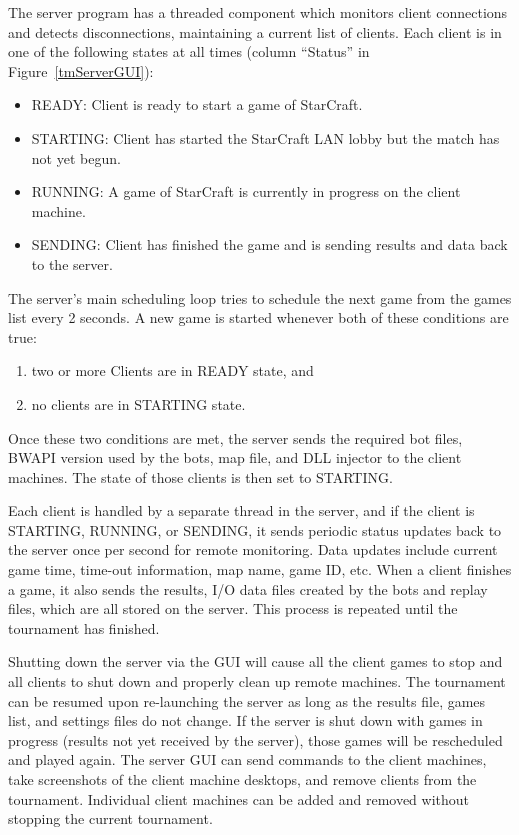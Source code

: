 The server program has a threaded component which monitors client connections and detects disconnections, maintaining a current list of clients. Each client is in one of the following states at all times (column ``Status'' in Figure~\ref{tmServerGUI}):

\begin{itemize}
\item READY: Client is ready to start a game of StarCraft.
\item STARTING: Client has started the StarCraft LAN lobby but the match has not yet begun.
\item RUNNING: A game of StarCraft is currently in progress on the client machine.
\item SENDING: Client has finished the game and is sending results and data back to the server.
\end{itemize}

The server's main scheduling loop tries to schedule the next game from the games list every 2 seconds. A new game is started whenever both of these conditions are true:

\begin{enumerate}
\item two or more Clients are in READY state, and
\item no clients are in STARTING state.
\end{enumerate}

\noindent Once these two conditions are met, the server sends the required bot files, BWAPI version used by the bots, map file, and DLL injector to the client machines. The state of those clients is then set to STARTING.

Each client is handled by a separate thread in the server, and if the client is STARTING, RUNNING, or SENDING, it sends periodic status updates back to the server once per second for remote monitoring. Data updates include current game time, time-out information, map name, game ID, etc. When a client finishes a game, it also sends the results, I/O data files created by the bots and replay files, which are all stored on the server. This process is repeated until the tournament has finished.

Shutting down the server via the GUI will cause all the client games to stop and all clients to shut down and properly clean up remote machines. The tournament can be resumed upon re-launching the server as long as the results file, games list, and settings files do not change. If the server is shut down with games in progress (results not yet received by the server), those games will be rescheduled and played again. The server GUI can send commands to the client machines, take screenshots of the client machine desktops, and remove clients from the tournament. Individual client machines can be added and removed without stopping the current tournament.

